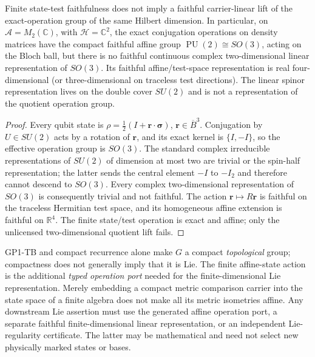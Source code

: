 \documentclass[12pt,a4paper]{article}
\begin{document}
\begin{proposition}
\label{p2a:prop:v281-qubit-affine-lift-obstruction}
Finite state-test faithfulness does not imply a faithful carrier-linear
lift of the exact-operation group of the same Hilbert dimension.  In
particular, on \(\mathcal A=M_2(\mathbb C)\), with \(\mathcal H=\mathbb C^2\),
the exact conjugation operations on density matrices have the compact
faithful affine group
\(\operatorname{PU}(2)\cong SO(3)\), acting on the Bloch ball, but there
is no faithful continuous complex two-dimensional linear representation
of \(SO(3)\).  Its faithful affine/test-space representation is real
four-dimensional (or three-dimensional on traceless test directions).
The linear spinor representation lives on the double cover \(SU(2)\)
and is not a representation of the quotient operation group.
\end{proposition}
\begin{proof}
Every qubit state is
\(\rho=\frac12(I+\mathbf r\cdot\boldsymbol\sigma)\),
\(\mathbf r\in\overline B^3\).  Conjugation by \(U\in SU(2)\)
acts by a rotation of \(\mathbf r\), and its exact kernel is
\(\{I,-I\}\), so the effective operation group is \(SO(3)\).
The standard complex irreducible representations of \(SU(2)\) of
dimension at most two are trivial or the spin-half representation; the
latter sends the central element \(-I\) to \(-I_2\) and therefore
cannot descend to \(SO(3)\).  Every complex two-dimensional
representation of \(SO(3)\) is consequently trivial and not faithful.
The action \(\mathbf r\mapsto R\mathbf r\) is faithful on the
traceless Hermitian test space, and its homogeneous affine extension is
faithful on \(\mathbb R^4\).  The finite state/test operation is exact
and affine; only the unlicensed two-dimensional quotient lift fails.
\end{proof}

\begin{remark}
\label{p2a:rem:v281-isometry-affine-lie-firewall}
GP1-TB and compact recurrence alone make \(G\) a compact \emph{topological}
group; compactness does not generally imply that it is Lie.  The finite
affine-state action is the additional \emph{typed operation port} needed for the finite-dimensional Lie representation.  Merely embedding
a compact metric comparison carrier into the state space of a finite
algebra does not make all its metric isometries affine.  Any downstream
Lie assertion must use the generated affine operation port, a separate
faithful finite-dimensional linear representation, or an independent
Lie-regularity certificate.  The latter may be mathematical and need
not select new physically marked states or bases.
\end{remark}
\end{document}
